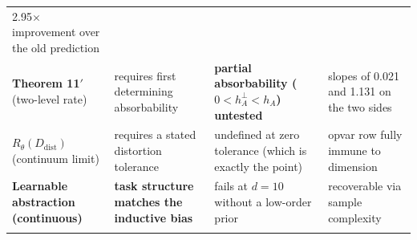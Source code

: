 \documentclass[11pt]{article}
\begin{document}
\begin{longtable}[]{@{}llll@{}}
\begin{minipage}[t]{0.22\columnwidth}
2.95\(\times\) improvement over the old prediction\strut
\end{minipage}\tabularnewline
\begin{minipage}[t]{0.22\columnwidth}\raggedright
\textbf{Theorem 11\('\)} (two-level rate)\strut
\end{minipage} & \begin{minipage}[t]{0.22\columnwidth}\raggedright
requires first determining absorbability\strut
\end{minipage} & \begin{minipage}[t]{0.22\columnwidth}\raggedright
\textbf{partial absorbability (\(0<h_A^\perp<h_A\)) untested}\strut
\end{minipage} & \begin{minipage}[t]{0.22\columnwidth}\raggedright
slopes of 0.021 and 1.131 on the two sides\strut
\end{minipage}\tabularnewline
\begin{minipage}[t]{0.22\columnwidth}\raggedright
\textbf{\(R_\theta(D_{\mathrm{dist}})\)} (continuum limit)\strut
\end{minipage} & \begin{minipage}[t]{0.22\columnwidth}\raggedright
requires a stated distortion tolerance\strut
\end{minipage} & \begin{minipage}[t]{0.22\columnwidth}\raggedright
undefined at zero tolerance (which is exactly the point)\strut
\end{minipage} & \begin{minipage}[t]{0.22\columnwidth}\raggedright
opvar row fully immune to dimension\strut
\end{minipage}\tabularnewline
\begin{minipage}[t]{0.22\columnwidth}\raggedright
\textbf{Learnable abstraction (continuous)}\strut
\end{minipage} & \begin{minipage}[t]{0.22\columnwidth}\raggedright
\textbf{task structure matches the inductive bias}\strut
\end{minipage} & \begin{minipage}[t]{0.22\columnwidth}\raggedright
fails at \(d=10\) without a low-order prior\strut
\end{minipage} & \begin{minipage}[t]{0.22\columnwidth}\raggedright
recoverable via sample complexity\strut
\end{minipage}\tabularnewline
\begin{minipage}[t]{0.22\columnwidth}\raggedright

\end{minipage}
\end{longtable}
\end{document}
